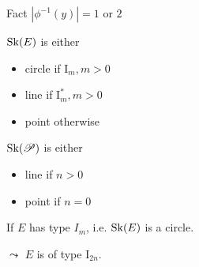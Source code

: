 \begin{frame}[t]
	\begin{minipage}[t]{.7\textwidth}
		
		\begin{block}{Fact}
			$|\phi^{-1}(y)| = 1 \text{ or } 2$
		\end{block}
		\begin{minipage}[t]{.49\textwidth}
			$\operatorname{Sk}(E)$ is either
			\begin{itemize}
				\item circle if $\mathrm I_m, m >0$
				\item line if $\mathrm I_{m}^*, m > 0$
				\item point otherwise
			\end{itemize}
		\end{minipage}
		\begin{minipage}[t]{.49\textwidth}
			$\operatorname{Sk}(\mathscr P)$ is either
			\begin{itemize}
				\item line if $n > 0$ 
				\item point if $n = 0$
			\end{itemize}
		\end{minipage}
		
	\end{minipage}
	\begin{minipage}[t]{.29\textwidth}
	\end{minipage}
\end{frame}
\begin{frame}
	If $E$ has type $I_m$, i.e. $\operatorname{Sk}(E)$ is a circle.
	\begin{figure}
	\end{figure}
	\pause
    $\leadsto$ $E$ is of type $\mathrm I_{2n}$.
\end{frame}

